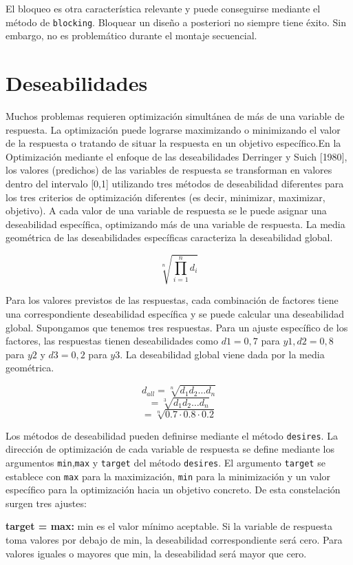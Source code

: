\documentclass[
]{book}
\begin{document}
El bloqueo es otra característica relevante y puede conseguirse mediante el método de \texttt{blocking}. Bloquear un diseño a posteriori no siempre tiene éxito.
Sin embargo, no es problemático durante el montaje secuencial.

\hypertarget{deseabilidades}{%
\section{Deseabilidades}\label{deseabilidades}}

Muchos problemas requieren optimización simultánea de más de una variable de respuesta. La optimización puede lograrse maximizando o minimizando el valor de la respuesta o tratando de situar la respuesta en un objetivo específico.En la Optimización mediante el enfoque de las deseabilidades Derringer y Suich {[}1980{]}, los valores (predichos) de las variables de respuesta se transforman en valores dentro del intervalo {[}0,1{]} utilizando tres métodos de deseabilidad diferentes
para los tres criterios de optimización diferentes (es decir, minimizar, maximizar, objetivo). A cada valor de una variable de respuesta se le puede asignar una deseabilidad específica, optimizando más de una variable de respuesta. La media geométrica de las deseabilidades específicas caracteriza la deseabilidad global.

\[\sqrt[n]{\prod^n_{i=1}d_i}\]

Para los valores previstos de las respuestas, cada combinación de factores tiene una correspondiente deseabilidad específica y se puede calcular una deseabilidad global. Supongamos que tenemos
tres respuestas. Para un ajuste específico de los factores, las respuestas tienen deseabilidades
como \(d1 = 0,7\) para \(y1, d2 = 0,8\) para \(y2\) y \(d3 = 0,2\) para \(y3\). La deseabilidad global
viene dada por la media geométrica.

\[d_{all}=\sqrt[n]{d_1d_2\ldots d_n}\]
\[=\sqrt[3]{d_1d_2\ldots d_n}\]
\[=\sqrt[n]{0.7\cdot0.8\cdot0.2}\]

Los métodos de deseabilidad pueden definirse mediante el método \texttt{desires}. La dirección de optimización de cada variable de respuesta se define mediante los argumentos \texttt{min},\texttt{max} y \texttt{target} del método \texttt{desires}. El argumento \texttt{target} se establece con \texttt{max} para la maximización, \texttt{min} para la minimización y un valor específico para la optimización hacia un objetivo concreto. De esta constelación surgen tres ajustes:

\textbf{target = max:} min es el valor mínimo aceptable. Si la variable de respuesta toma valores por debajo de min, la deseabilidad correspondiente será cero. Para valores iguales o mayores que min, la deseabilidad será mayor que cero.
\end{document}
